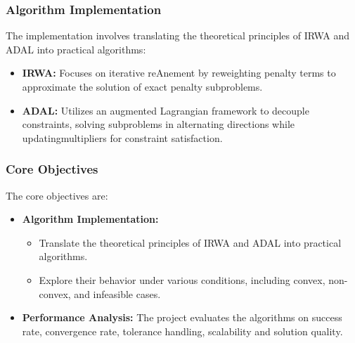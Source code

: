 \documentclass{article}
\begin{document}
\subsubsection{Algorithm Implementation}
The implementation involves translating the theoretical principles of IRWA and ADAL into practical algorithms:
\begin{itemize}
    \item \textbf{IRWA:} Focuses on iterative reAnement by reweighting penalty terms to approximate the solution of exact penalty subproblems.
    \item \textbf{ADAL:} Utilizes an augmented Lagrangian framework to decouple constraints, solving subproblems in alternating directions while updatingmultipliers for constraint satisfaction.
\end{itemize}

\subsubsection{Core Objectives}
The core objectives are:
\begin{itemize}
    \item \textbf{Algorithm Implementation:} 
    \begin{itemize}
        \item Translate the theoretical principles of IRWA and ADAL into practical algorithms.
        \item Explore their behavior under various conditions, including convex, non-convex, and infeasible cases.
    \end{itemize}
    \item \textbf{Performance Analysis:} The project evaluates the algorithms on success rate, convergence rate, tolerance handling, scalability and solution quality.
\end{itemize}

\end{document}
